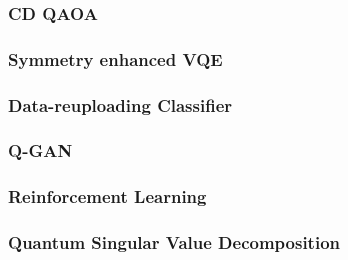 \subsubsection{CD QAOA}


\subsubsection{Symmetry enhanced VQE}


\subsubsection{Data-reuploading Classifier}


\subsubsection{Q-GAN}


\subsubsection{Reinforcement Learning}


\subsubsection{Quantum Singular Value Decomposition}

